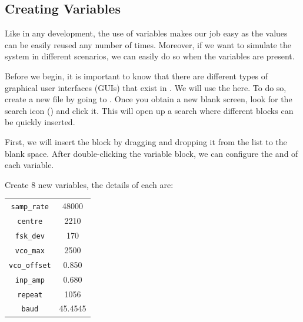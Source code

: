 \documentclass[11pt]{article}
\begin{document}
\subsection{Creating Variables}

Like in any development, the use of variables makes our job easy as the values can be easily reused any number of times. Moreover, if we want to simulate the system in different scenarios, we can easily do so when the variables are present.

Before we begin, it is important to know that there are different types of graphical user interfaces (GUIs) that exist in . We will use the  here. To do so, create a new file by going to \newline {}. Once you obtain a new blank screen, look for the search icon  () and click it. This will open up a search where different blocks can be quickly inserted.

First, we will insert the  block by dragging and dropping it from the list to the blank space. After double-clicking the variable block, we can configure the  and  of each variable.


\begin{tcolorbox}[colback=blue!5]
  \begin{outline}
    \1 Create 8 new variables, the details of each are:
  \end{outline}
  \centering
  \begin{tabular}{|c|c|}
    \hline
    \texttt{samp\_rate}  & 48000   \\
    \texttt{centre}      & 2210    \\
    \texttt{fsk\_dev}    & 170     \\
    \texttt{vco\_max}    & 2500    \\
    \texttt{vco\_offset} & 0.850   \\
    \texttt{inp\_amp}    & 0.680   \\
    \texttt{repeat}      & 1056    \\
    \texttt{baud}        & 45.4545 \\
    \hline
  \end{tabular}
\end{tcolorbox}
\end{document}
